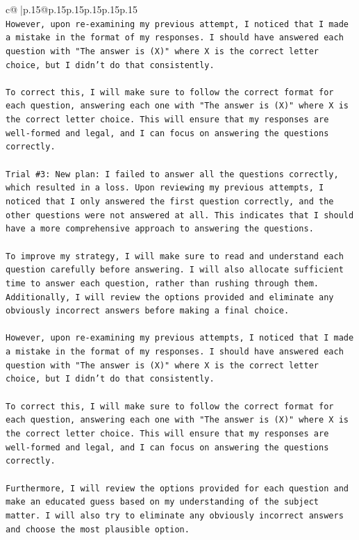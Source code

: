 \documentclass{article}
\begin{document}
{\begin{supertabular}{c@{$\;$}|p{.15\linewidth}@{}p{.15\linewidth}p{.15\linewidth}p{.15\linewidth}p{.15\linewidth}p{.15\linewidth}}
{{{\\ 
\texttt{However, upon re{-}examining my previous attempt, I noticed that I made a mistake in the format of my responses. I should have answered each question with "The answer is (X)" where X is the correct letter choice, but I didn't do that consistently. } \\
\\ 
\texttt{To correct this, I will make sure to follow the correct format for each question, answering each one with "The answer is (X)" where X is the correct letter choice. This will ensure that my responses are well{-}formed and legal, and I can focus on answering the questions correctly.} \\
\\ 
\texttt{Trial \#3: New plan: I failed to answer all the questions correctly, which resulted in a loss. Upon reviewing my previous attempts, I noticed that I only answered the first question correctly, and the other questions were not answered at all. This indicates that I should have a more comprehensive approach to answering the questions.} \\
\\ 
\texttt{To improve my strategy, I will make sure to read and understand each question carefully before answering. I will also allocate sufficient time to answer each question, rather than rushing through them. Additionally, I will review the options provided and eliminate any obviously incorrect answers before making a final choice.} \\
\\ 
\texttt{However, upon re{-}examining my previous attempts, I noticed that I made a mistake in the format of my responses. I should have answered each question with "The answer is (X)" where X is the correct letter choice, but I didn't do that consistently.} \\
\\ 
\texttt{To correct this, I will make sure to follow the correct format for each question, answering each one with "The answer is (X)" where X is the correct letter choice. This will ensure that my responses are well{-}formed and legal, and I can focus on answering the questions correctly.} \\
\\ 
\texttt{Furthermore, I will review the options provided for each question and make an educated guess based on my understanding of the subject matter. I will also try to eliminate any obviously incorrect answers and choose the most plausible option.} \\
}}}
\end{supertabular}}
\end{document}
